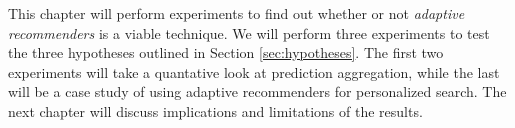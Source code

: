 \label{chap:results}

This chapter will perform experiments to find out whether or not
\emph{adaptive recommenders} is a viable technique.
We will perform three experiments to 
test the three hypotheses outlined in Section 
\ref{sec:hypotheses}.
The first two experiments will take a quantative look
at prediction aggregation, while the last 
will be a case study of using adaptive recommenders
for personalized search.
The next chapter will discuss implications 
and limitations of the results.







%

